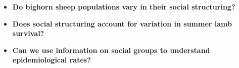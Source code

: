 \documentclass[fleqn,xcolor=table]{beamer}
\begin{document}
%
%
{
\begin{frame}[t]
	\begin{itemize}
		\item[] \color{navy} \footnotesize \textbf{Do bighorn sheep populations vary in their social
			structuring?}
			\vspace{.8in}
		\item[] \color{navy} \footnotesize \textbf{Does social
				structuring account for variation in
			summer lamb survival?}
			\vspace{.8in}
		\item[] \color{navy} \footnotesize \textbf{Can we use information on social
			groups to understand 
			epidemiological rates?}
	\end{itemize}
\end{frame}
}
%
\end{document}
